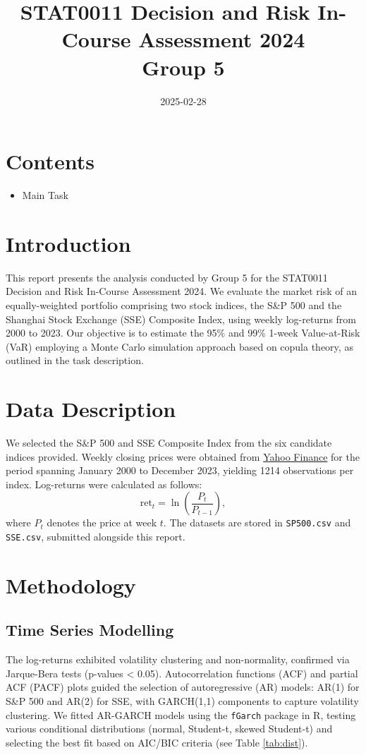 \documentclass[a4paper,10pt]{article}
\title{STAT0011 Decision and Risk In-Course Assessment 2024 \\ Group 5}
\author{}
\date{2025-02-28}
\begin{document}
\maketitle

\section*{Contents}
\begin{itemize}
    \item Main Task
\end{itemize}

\section{Introduction}
This report presents the analysis conducted by Group 5 for the STAT0011 Decision and Risk In-Course Assessment 2024. We evaluate the market risk of an equally-weighted portfolio comprising two stock indices, the S\&P 500 and the Shanghai Stock Exchange (SSE) Composite Index, using weekly log-returns from 2000 to 2023. Our objective is to estimate the 95\% and 99\% 1-week Value-at-Risk (VaR) employing a Monte Carlo simulation approach based on copula theory, as outlined in the task description.

\section{Data Description}
We selected the S\&P 500 and SSE Composite Index from the six candidate indices provided. Weekly closing prices were obtained from \href{https://finance.yahoo.com}{Yahoo Finance} for the period spanning January 2000 to December 2023, yielding 1214 observations per index. Log-returns were calculated as follows:
\[
\text{ret}_t = \ln\left(\frac{P_t}{P_{t-1}}\right),
\]
where $P_t$ denotes the price at week $t$. The datasets are stored in \texttt{SP500.csv} and \texttt{SSE.csv}, submitted alongside this report.

\section{Methodology}
\subsection{Time Series Modelling}
The log-returns exhibited volatility clustering and non-normality, confirmed via Jarque-Bera tests (p-values < 0.05). Autocorrelation functions (ACF) and partial ACF (PACF) plots guided the selection of autoregressive (AR) models: AR(1) for S\&P 500 and AR(2) for SSE, with GARCH(1,1) components to capture volatility clustering. We fitted AR-GARCH models using the \texttt{fGarch} package in R, testing various conditional distributions (normal, Student-t, skewed Student-t) and selecting the best fit based on AIC/BIC criteria (see Table \ref{tab:dist}).
\end{document}
